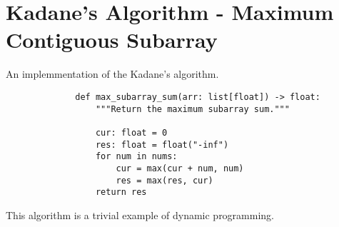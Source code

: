 
\section{Kadane's Algorithm - Maximum Contiguous Subarray}

An implemmentation of the Kadane's algorithm.

\begin{figure}[H]
    \centering
    \begin{verbatim}
        def max_subarray_sum(arr: list[float]) -> float:
            """Return the maximum subarray sum."""

            cur: float = 0
            res: float = float("-inf")
            for num in nums:
                cur = max(cur + num, num)
                res = max(res, cur)
            return res
    \end{verbatim}
\end{figure}

This algorithm is a trivial example of dynamic programming.
